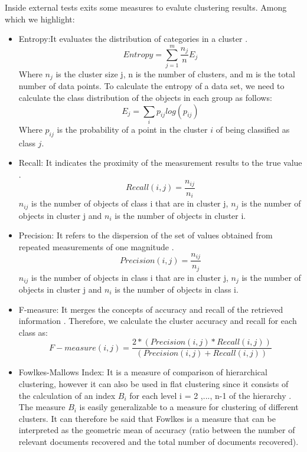 Inside external tests exits some measures to evalute clustering results. Among which we highlight:

\begin{itemize}
    \item Entropy:It evaluates the distribution of categories in a cluster \citep{b40}.
    \begin{equation}
        Entropy =  \sum_{j=1}^{m} \frac{n_{j}}{n}E_{j}
    \end{equation}
    Where $n_{j}$ is the cluster size j, n is the number of clusters, and m is the total number of data points. To calculate the entropy of a data set, we need to calculate the class distribution of the objects in each group as follows:
    \begin{equation}
        E_{j} =  \sum_{i} p_{ij}log(p_{ij})
    \end{equation}
    Where $p_{ij}$ is the probability of a point in the cluster $i$ of being classified as class $j$.
    \item Recall: It indicates the proximity of the measurement results to the true value \citep{b41}.
    \begin{equation}
         Recall(i,j) = \frac{n_{ij}}{n_{i}}
    \end{equation}
    $n_{ij}$ is the number of objects of class i that are in cluster j, $n_{j}$ is the number of objects in cluster j and $n_{i}$ is the number of objects in cluster i.
    \item Precision: It refers to the dispersion of the set of values obtained from repeated measurements of one magnitude \citep{b41}.
        \begin{equation}
            Precision(i,j) = \frac{n_{ij}}{n_{j}}
        \end{equation}
     $n_{ij}$ is the number of objects in class i that are in cluster j, $n_{j}$ is the number of objects in cluster j and $n_{i}$ is the number of objects in class i.
    \item F-measure: It merges the concepts of accuracy and recall of the retrieved information \citep{b42}. Therefore, we calculate the cluster accuracy and recall for each class as:
    \begin{equation}
        F-measure(i,j) = \frac{2 * (Precision(i,j) * Recall(i,j))}{(Precision(i,j) + Recall(i,j))}
    \end{equation}
    \item Fowlkes-Mallows Index: It is a measure of comparison of hierarchical clustering, however it can also be used in flat clustering since it consists of the calculation of an index $B_{i}$ for each level i = 2 ,..., n-1 of the hierarchy \citep{b43}. The measure $B_{i}$ is easily generalizable to a measure for clustering of different clusters. It can therefore be said that Fowlkes is a measure that can be interpreted as the geometric mean of accuracy (ratio between the number of relevant documents recovered and the total number of documents recovered).

\end{itemize}
